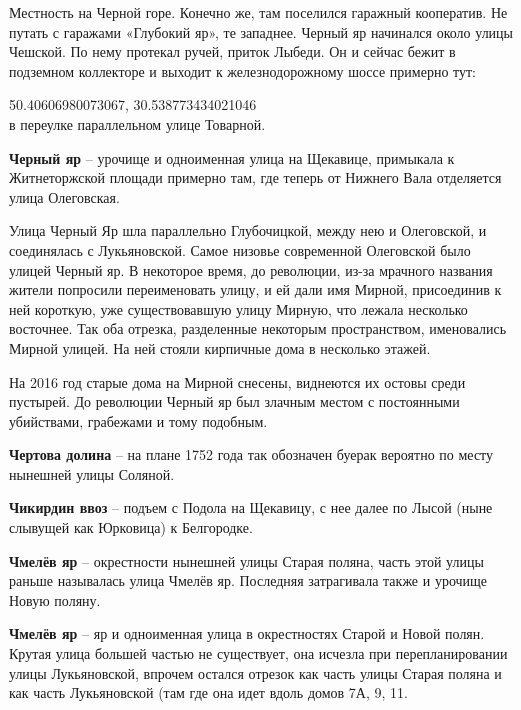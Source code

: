 Местность на Черной горе. Конечно же, там поселился гаражный кооператив. Не путать с гаражами «Глубокий яр», те западнее. Черный яр начинался около улицы Чешской. По нему протекал ручей, приток Лыбеди. Он и сейчас бежит в подземном коллекторе и выходит к железнодорожному шоссе примерно тут:

50.40606980073067, 30.538773434021046\\

в переулке параллельном улице Товарной.\\

\medskip

\textbf{Черный яр} – урочище и одноименная улица на Щекавице, примыкала к Житнеторжской площади примерно там, где теперь от Нижнего Вала отделяется улица Олеговская. 

Улица Черный Яр шла параллельно Глубочицкой, между нею и Олеговской, и соединялась с Лукьяновской. Самое низовье современной Олеговской было улицей Черный яр. В некоторое время, до революции, из-за мрачного названия жители попросили переименовать улицу, и ей дали имя Мирной, присоединив к ней короткую, уже существовавшую улицу Мирную, что лежала несколько восточнее. Так оба отрезка, разделенные некоторым пространством, именовались Мирной улицей. На ней стояли кирпичные дома в несколько этажей.

На 2016 год старые дома на Мирной снесены, виднеются их остовы среди пустырей. До революции Черный яр был злачным местом с постоянными убийствами, грабежами и тому подобным.\\

\medskip


\textbf{Чертова долина} – на плане 1752 года так обозначен буерак вероятно по месту нынешней улицы Соляной.\\

\medskip


\textbf{Чикирдин ввоз} – подъем с Подола на Щекавицу, с нее далее по Лысой (ныне слывущей как Юрковица) к Белгородке.\\

\medskip


\textbf{Чмелёв яр} – окрестности нынешней улицы Старая поляна, часть этой улицы раньше называлась улица Чмелёв яр. Последняя затрагивала также и урочище Новую поляну.\\

\medskip


\textbf{Чмелёв яр} – яр и одноименная улица в окрестностях Старой и Новой полян. Крутая улица большей частью не существует, она исчезла при перепланировании улицы Лукьяновской, впрочем остался отрезок как часть улицы Старая поляна и как часть Лукьяновской (там где она идет вдоль домов 7А, 9, 11.

